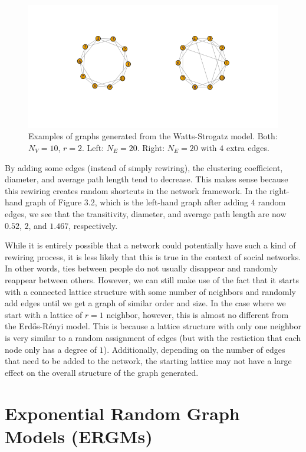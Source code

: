 \documentclass[12pt,twoside]{amherstthesis}
\begin{document}
  \begin{figure}[htbp]
  \centering
  \includegraphics{figure/22wattsstrogatzexample.png}
  \caption{Examples of graphs generated from the Watts-Strogatz model.
  Both: \(N_V = 10\), \(r = 2\). Left: \(N_E = 20\). Right: \(N_E = 20\)
  with \(4\) extra edges.}
  \end{figure}
  
  By adding some edges (instead of simply rewiring), the clustering
  coefficient, diameter, and average path length tend to decrease. This
  makes sense because this rewiring creates random shortcuts in the
  network framework. In the right-hand graph of Figure 3.2, which is the
  left-hand graph after adding \(4\) random edges, we see that the
  transitivity, diameter, and average path length are now \(0.52\), \(2\),
  and \(1.467\), respectively.
  
  While it is entirely possible that a network could potentially have such
  a kind of rewiring process, it is less likely that this is true in the
  context of social networks. In other words, ties between people do not
  usually disappear and randomly reappear between others. However, we can
  still make use of the fact that it starts with a connected lattice
  structure with some number of neighbors and randomly add edges until we
  get a graph of similar order and size. In the case where we start with a
  lattice of \(r = 1\) neighbor, however, this is almost no different from
  the Erdős-Rényi model. This is because a lattice structure with only one
  neighbor is very similar to a random assignment of edges (but with the
  restiction that each node only has a degree of \(1\)). Additionally,
  depending on the number of edges that need to be added to the network,
  the starting lattice may not have a large effect on the overall
  structure of the graph generated.
  
  \section{Exponential Random Graph Models
  (ERGMs)}\label{exponential-random-graph-models-ergms}
  
\end{document}
